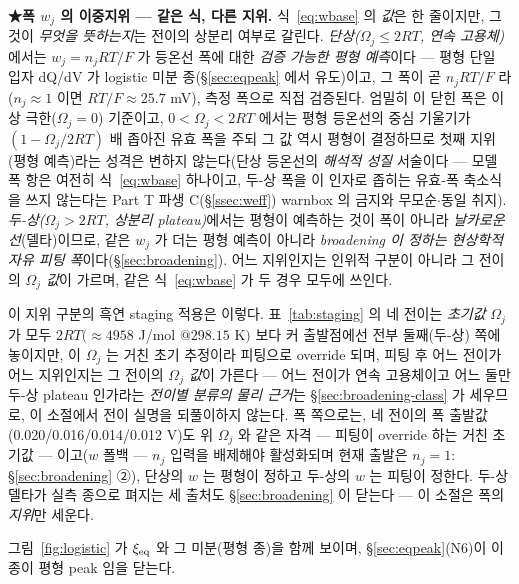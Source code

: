\textbf{★폭 $w_j$ 의 이중지위 --- 같은 식, 다른 지위.} 식~\eqref{eq:wbase} 의 \emph{값}은 한 줄이지만, 그것이
\emph{무엇을 뜻하는지}는 전이의 상분리 여부로 갈린다. \emph{단상($\Omega_j\le2RT$, 연속 고용체)}에서는 $w_j=n_jRT/F$
가 등온선 폭에 대한 \emph{검증 가능한 평형 예측}이다 --- 평형 단일 입자 dQ/dV 가 logistic
미분 종(\S\ref{sec:eqpeak} 에서 유도)이고, 그 폭이 곧 $n_jRT/F$ 라($n_j\!\approx\!1$ 이면 $RT/F\!\approx\!25.7$ mV), 측정 폭으로 직접 검증된다. 엄밀히 이 닫힌 폭은 이상 극한($\Omega_j=0$) 기준이고,
$0<\Omega_j<2RT$ 에서는 평형 등온선의 중심 기울기가 $(1-\Omega_j/2RT)$ 배 좁아진 유효 폭을 주되 그
값 역시 평형이 결정하므로 첫째 지위(평형 예측)라는 성격은 변하지 않는다(단상 등온선의 \emph{해석적 성질}
서술이다 --- 모델 폭 항은 여전히 식~\eqref{eq:wbase} 하나이고, 두-상 폭을 이 인자로 좁히는 유효-폭
축소식을 쓰지 않는다는 Part T 파생 C(\S\ref{ssec:weff}) warnbox 의 금지와 무모순$\cdot$동일 취지).
\emph{두-상($\Omega_j>2RT$, 상분리 plateau)}에서는 평형이 예측하는 것이 폭이 아니라 \emph{날카로운 선}(델타)이므로,
같은 $w_j$ 가 더는 평형 예측이 아니라 \emph{broadening 이 정하는 현상학적 자유 피팅 폭}이다(\S\ref{sec:broadening}).
어느 지위인지는 인위적 구분이 아니라 그 전이의 \emph{$\Omega_j$ 값}이 가르며, 같은 식~\eqref{eq:wbase} 가 두 경우 모두에
쓰인다.

이 지위 구분의 흑연 staging 적용은 이렇다. 표~\ref{tab:staging} 의 네 전이는 \emph{초기값} $\Omega_j$ 가 모두 $2RT(\!\approx\!4958$ J/mol
$@298.15$ K$)$ 보다 커 출발점에선 전부 둘째(두-상) 쪽에 놓이지만, 이 $\Omega_j$ 는 거친 초기 추정이라 피팅으로
override 되며, 피팅 후 어느 전이가 어느 지위인지는 그 전이의 \emph{$\Omega_j$ 값}이 가른다 --- 어느 전이가
연속 고용체이고 어느 둘만 두-상 plateau 인가라는 \emph{전이별 분류의 물리 근거}는 \S\ref{sec:broadening-class} 가
세우므로, 이 소절에서 전이 실명을 되풀이하지 않는다. 폭 쪽으로는, 네 전이의 폭 출발값(0.020/0.016/0.014/0.012 V)도 위 $\Omega_j$ 와 같은 자격 --- 피팅이
override 하는 거친 초기값 --- 이고($w$ 폴백 --- $n_j$ 입력을
배제해야 활성화되며 현재 출발은 $n_j{=}1$: \S\ref{sec:broadening} ②), 단상의 $w$ 는 평형이
정하고 두-상의 $w$ 는 피팅이 정한다. 두-상 델타가 실측 종으로 펴지는 세 출처도 \S\ref{sec:broadening} 이 닫는다 --- 이 소절은 폭의 \emph{지위}만 세운다.

그림~\ref{fig:logistic} 가 $\xi_{\mathrm{eq}}$ 와 그 미분(평형 종)을 함께 보이며, \S\ref{sec:eqpeak}(N6)이 이 종이 평형 peak 임을 닫는다.

